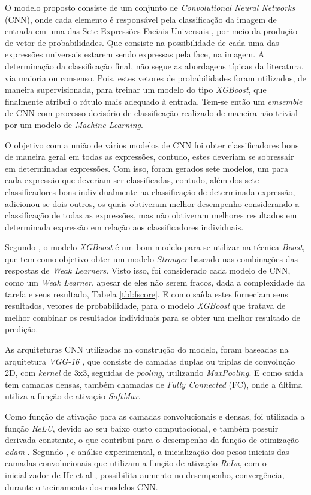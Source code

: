 
O modelo proposto consiste de um conjunto de \emph{Convolutional Neural Networks} (CNN), onde cada elemento é responsável pela classificação da imagem de entrada em uma das Sete Expressões Faciais Universais \cite{}, por meio da produção de vetor de probabilidades. Que consiste na possibilidade de cada uma das expressões universais estarem sendo expressas pela face, na imagem. A determinação da classificação final, não segue as abordagens típicas da literatura, via maioria ou consenso. Pois, estes vetores de probabilidades foram utilizados, de maneira supervisionada, para treinar um modelo do tipo \emph{XGBoost}, que finalmente atribui o rótulo mais adequado à entrada. Tem-se então um \emph{emsemble} de CNN com processo decisório de classificação realizado de maneira não trivial por um modelo de \emph{Machine Learning}.

O objetivo com a união de vários modelos de CNN foi obter classificadores bons de maneira geral em todas as expressões, contudo, estes deveriam se sobressair em determinadas expressões. Com isso, foram gerados sete modelos, um para cada expressão que deveriam ser classificadas, contudo, além dos sete classificadores bons individualmente na classificação de determinada expressão, adicionou-se dois outros, os quais obtiveram melhor desempenho considerando a classificação de todas as expressões, mas não obtiveram melhores resultados em determinada expressão em relação aos classificadores individuais.

Segundo \cite{}, o modelo \emph{XGBoost} é um bom modelo para se utilizar na técnica \emph{Boost}, que tem como objetivo obter um modelo \emph{Stronger} baseado nas combinações das respostas de \emph{Weak Learners}. Visto isso, foi considerado cada modelo de CNN, como um \emph{Weak Learner}, apesar de eles não serem fracos, dada a complexidade da tarefa e seus resultado, Tabela \ref{tbl:fscore}. E como saída estes forneciam seus resultados, vetores de probabilidade, para o modelo \emph{XGBoost} que tratava de melhor combinar os resultados individuais para se obter um melhor resultado de predição.

As arquiteturas CNN utilizadas na construção do modelo, foram baseadas na arquitetura \emph{VGG-16} \cite{}, que consiste de camadas duplas ou triplas de convolução 2D, com \emph{kernel} de 3x3, seguidas de \emph{pooling}, utilizando \emph{MaxPooling}. E como saída tem camadas densas, também chamadas de \emph{Fully Connected} (FC), onde a última utiliza a função de ativação \emph{SoftMax}.

Como função de ativação para as camadas convolucionais e densas, foi utilizada a função \emph{ReLU}, devido ao seu baixo custo computacional, e também possuir derivada constante, o que contribui para o desempenho da função de otimização \emph{adam} \cite{}. Segundo \cite{}, e análise experimental, a inicialização dos pesos iniciais das camadas convolucionais que utilizam a função de ativação \emph{ReLu}, com o inicializador de He et al \cite{}, possibilita aumento no desempenho, convergência, durante o treinamento dos modelos CNN.

